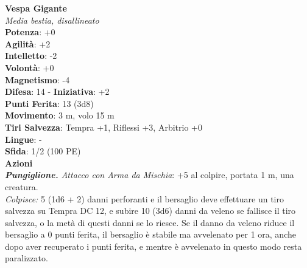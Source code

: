 \begin{multicols}{2}
\medskip\textbf{Vespa Gigante}\\
\emph{Media bestia, disallineato}\\
\textbf{Potenza}: +0\\
\textbf{Agilità}: +2\\
\textbf{Intelletto}: -2\\
\textbf{Volontà}: +0\\
\textbf{Magnetismo}: -4\\
\textbf{Difesa}: 14 - \textbf{Iniziativa}: +2\\
\textbf{Punti Ferita}: 13 (3d8)\\
\textbf{Movimento}: 3 m, volo 15 m\\
\textbf{Tiri Salvezza}: Tempra +1, Riflessi +3, Arbitrio +0 \\
\textbf{Lingue}: -\\
\textbf{Sfida}: 1/2 (100 PE)\smallskip\\
\smallskip\textbf{Azioni}\\
\emph{\textbf{Pungiglione.} Attacco con Arma da Mischia}: +5 al colpire, portata 1 m, una creatura.\\
\emph{Colpisce:} 5 (1d6 + 2) danni perforanti e il bersaglio deve effettuare un tiro salvezza su Tempra DC  12, e subire 10 (3d6) danni da veleno se fallisce il tiro salvezza, o la metà di questi danni se lo riesce. Se il danno da veleno riduce il bersaglio a 0 punti ferita, il bersaglio è stabile ma avvelenato per 1 ora, anche dopo aver recuperato i punti ferita, e mentre è avvelenato in questo modo resta paralizzato.\\


\end{multicols}
